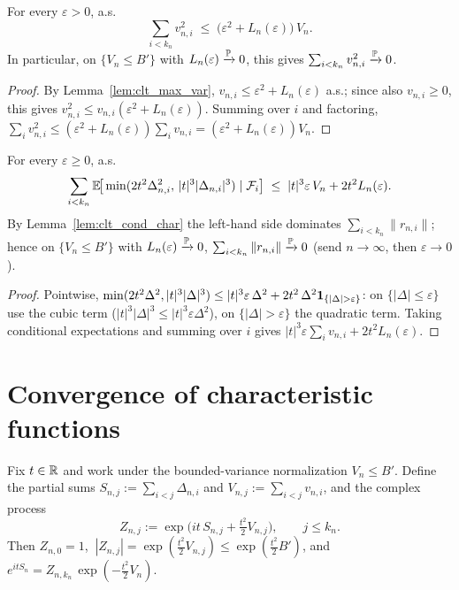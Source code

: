 \begin{lemma}\label{lem:clt_sum_var_sq}
\leanok
{}
For every $\varepsilon>0$, a.s.
\[
  \sum_{i<k_n} v_{n,i}^2 \;\le\; \big(\varepsilon^2 + L_n(\varepsilon)\big)\,V_n .
\]
In particular, on $\{V_n\le B'\}$ with $L_n(\varepsilon)\xrightarrow{\mathbb{P}}0$, this
gives $\sum_{i<k_n}v_{n,i}^2\xrightarrow{\mathbb{P}}0$.
\end{lemma}

\begin{proof}\leanok
{}
By Lemma~\ref{lem:clt_max_var}, $v_{n,i}\le\varepsilon^2+L_n(\varepsilon)$ a.s.;
since also $v_{n,i}\ge0$, this gives $v_{n,i}^2\le v_{n,i}(\varepsilon^2+L_n(\varepsilon))$.
Summing over $i$ and factoring, $\sum_i v_{n,i}^2\le(\varepsilon^2+L_n(\varepsilon))\sum_i v_{n,i}
=(\varepsilon^2+L_n(\varepsilon))V_n$.
\end{proof}

\begin{lemma}\label{lem:clt_sum_rem}
\leanok
{}
For every $\varepsilon\ge0$, a.s.
\[
  \sum_{i<k_n}\mathbb{E}\!\big[\min(2t^2\Delta_{n,i}^2,\,|t|^3|\Delta_{n,i}|^3)\mid\mathcal{F}_i\big]
  \;\le\; |t|^3\varepsilon\,V_n + 2t^2 L_n(\varepsilon).
\]
By Lemma~\ref{lem:clt_cond_char} the left-hand side dominates $\sum_{i<k_n}\|r_{n,i}\|$;
hence on $\{V_n\le B'\}$ with $L_n(\varepsilon)\xrightarrow{\mathbb{P}}0$,
$\sum_{i<k_n}\|r_{n,i}\|\xrightarrow{\mathbb{P}}0$ (send $n\to\infty$, then $\varepsilon\to0$).
\end{lemma}

\begin{proof}\leanok
{}
Pointwise, $\min(2t^2\Delta^2,|t|^3|\Delta|^3)\le
|t|^3\varepsilon\,\Delta^2 + 2t^2\,\Delta^2\indic_{\{|\Delta|>\varepsilon\}}$: on
$\{|\Delta|\le\varepsilon\}$ use the cubic term ($|t|^3|\Delta|^3\le|t|^3\varepsilon\Delta^2$),
on $\{|\Delta|>\varepsilon\}$ the quadratic term. Taking conditional expectations
and summing over $i$ gives $|t|^3\varepsilon\sum_i v_{n,i}+2t^2 L_n(\varepsilon)$.
\end{proof}

\section{Convergence of characteristic functions}
\label{sec:pre_clt_char}

Fix $t\in\mathbb{R}$ and work under the bounded-variance normalization $V_n\le B'$.
Define the partial sums $S_{n,j}:=\sum_{i<j}\Delta_{n,i}$ and
$V_{n,j}:=\sum_{i<j}v_{n,i}$, and the complex process
\[
  Z_{n,j} := \exp\!\Big(i t\,S_{n,j} + \tfrac{t^2}{2}V_{n,j}\Big),
  \qquad j\le k_n .
\]
Then $Z_{n,0}=1$, $\ |Z_{n,j}|=\exp(\tfrac{t^2}{2}V_{n,j})\le\exp(\tfrac{t^2}{2}B')$,
and $e^{itS_n}=Z_{n,k_n}\,\exp(-\tfrac{t^2}{2}V_n)$.

